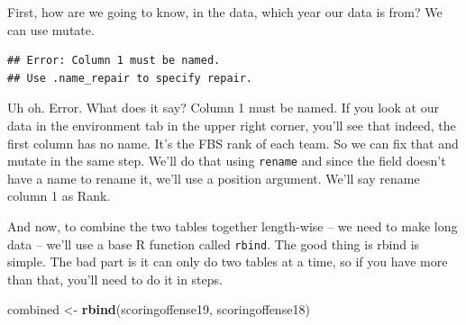 \documentclass[]{book}
\newenvironment{Shaded}{\begin{snugshade}}{\end{snugshade}}
\newcommand{\DataTypeTok}[1]{\textcolor[rgb]{0.13,0.29,0.53}{#1}}
\newcommand{\DecValTok}[1]{\textcolor[rgb]{0.00,0.00,0.81}{#1}}
\newcommand{\KeywordTok}[1]{\textcolor[rgb]{0.13,0.29,0.53}{\textbf{#1}}}
\newcommand{\NormalTok}[1]{#1}
\newcommand{\OperatorTok}[1]{\textcolor[rgb]{0.81,0.36,0.00}{\textbf{#1}}}
\newcommand{\StringTok}[1]{\textcolor[rgb]{0.31,0.60,0.02}{#1}}
\begin{document}
First, how are we going to know, in the data, which year our data is from? We can use mutate.

\begin{Shaded}
\end{Shaded}

\begin{verbatim}
## Error: Column 1 must be named.
## Use .name_repair to specify repair.
\end{verbatim}

Uh oh. Error. What does it say? Column 1 must be named. If you look at our data in the environment tab in the upper right corner, you'll see that indeed, the first column has no name. It's the FBS rank of each team. So we can fix that and mutate in the same step. We'll do that using \texttt{rename} and since the field doesn't have a name to rename it, we'll use a position argument. We'll say rename column 1 as Rank.

\begin{Shaded}
\end{Shaded}

And now, to combine the two tables together length-wise -- we need to make long data -- we'll use a base R function called \texttt{rbind}. The good thing is rbind is simple. The bad part is it can only do two tables at a time, so if you have more than that, you'll need to do it in steps.

\begin{Shaded}
\begin{Highlighting}[]
\NormalTok{combined <-}\StringTok{ }\KeywordTok{rbind}\NormalTok{(scoringoffense19, scoringoffense18)}
\end{Highlighting}
\end{Shaded}
\end{document}
